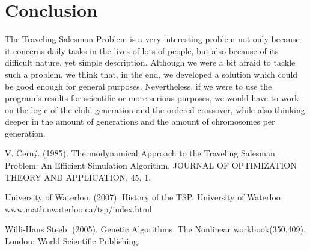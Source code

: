 \documentclass[twoside,twocolumn]{article}
\begin{document}
\section{Conclusion}
  
The Traveling Salesman Problem is a very interesting problem not only because it concerns daily tasks in the lives of lots of people, but also because of its difficult nature, yet simple description. Although we were a bit afraid to tackle such a problem, we think that, in the end, we developed a solution which could be good enough for general purposes. Nevertheless, if we were to use the program's results for scientific or more serious purposes, we would have to work on the logic of the child generation and the ordered crossover, while also thinking deeper in the amount of generations and the amount of chromosomes per generation.
  
  
  \begin{thebibliography}{99} %
  
  
  V. Černý. (1985). 
  \newblock Thermodynamical Approach to the Traveling Salesman Problem: An Efficient Simulation Algorithm. 
  \newblock JOURNAL OF OPTIMIZATION THEORY AND APPLICATION, 45, 1.
  
  University of Waterloo. (2007). 
  \newblock History of the TSP. University of Waterloo
  \newblock www.math.uwaterloo.ca/tsp/index.html
  
  Willi-Hans Steeb. (2005). 
  \newblock Genetic Algorithms. 
  \newblock The Nonlinear workbook(350.409). London: World Scientific Publishing.
  
  \end{thebibliography}
  
  
  
\end{document}
